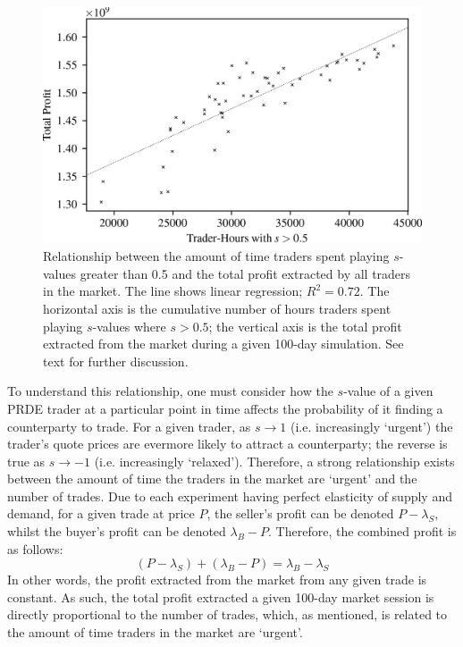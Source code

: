 \documentclass[conference]{IEEEtran}
\begin{document}
\begin{figure}[htbp]
    \centerline{\includegraphics[width=\columnwidth]{strategy_profit.png}}
    \caption{
        Relationship between the amount of time traders spent playing $s$-values greater than 0.5 and the total profit extracted by all traders in the market.
        The line shows linear regression; $R^2=0.72$.
        The horizontal axis is the cumulative number of hours traders spent playing $s$-values where $s>0.5$; the vertical axis is the total profit extracted from the market during a given 100-day simulation.
        See text for further discussion.
    }
    \label{strategy_profit}
\end{figure}

To understand this relationship, one must consider how the $s$-value of a given PRDE trader at a particular point in time affects the probability of it finding a counterparty to trade.
For a given trader, as $s\to1$ (i.e. increasingly `urgent') the trader's quote prices are evermore likely to attract a counterparty; the reverse is true as $s\to-1$ (i.e. increasingly `relaxed').
Therefore, a strong relationship exists between the amount of time the traders in the market are `urgent' and the number of trades.
Due to each experiment having perfect elasticity of supply and demand, for a given trade at price $P$, the seller's profit can be denoted $P-\lambda_S$, whilst the buyer's profit can be denoted $\lambda_B-P$.
Therefore, the combined profit is as follows:
\[
  (P-\lambda_S) + (\lambda_B-P)=\lambda_B-\lambda_S
\]
In other words, the profit extracted from the market from any given trade is constant.
As such, the total profit extracted a given 100-day market session is directly proportional to the number of trades, which, as mentioned, is related to the amount of time traders in the market are `urgent'.
\end{document}
